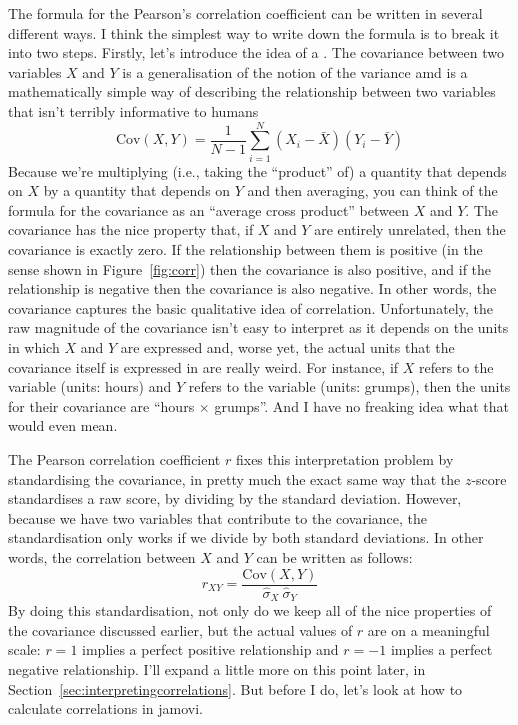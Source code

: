 
The formula for the Pearson's correlation coefficient can be written in several different ways. I think the simplest way to write down the formula is to break it into two steps. Firstly, let's introduce the idea of a . The covariance between two variables $X$ and $Y$ is a generalisation of the notion of the variance amd is a mathematically simple way of describing the relationship between two variables that isn't terribly informative to humans
$$
\mbox{Cov}(X,Y) = \frac{1}{N-1} \sum_{i=1}^N \left( X_i - \bar{X} \right) \left( Y_i - \bar{Y} \right)
$$
Because we're multiplying (i.e., taking the ``product'' of) a quantity that depends on $X$ by a quantity that depends on $Y$ and then averaging, you can think of the formula for the covariance as an ``average cross product'' between $X$ and $Y$. The covariance has the nice property that, if $X$ and $Y$ are entirely unrelated, then the covariance is exactly zero. If the relationship between them is positive (in the sense shown in Figure~\ref{fig:corr}) then the covariance is also positive, and if the relationship is negative then the covariance is also negative. In other words, the covariance captures the basic qualitative idea of correlation. Unfortunately, the raw magnitude of the covariance isn't easy to interpret as it depends on the units in which $X$ and $Y$ are expressed and, worse yet, the actual units that the covariance itself is expressed in are really weird. For instance, if $X$ refers to the  variable (units: hours) and $Y$ refers to the  variable (units: grumps), then the units for their covariance are ``hours $\times$ grumps''. And I have no freaking idea what that would even mean. 

The Pearson correlation coefficient $r$ fixes this interpretation problem by standardising the covariance, in pretty much the exact same way that the $z$-score standardises a raw score, by dividing by the standard deviation. However, because we have two variables that contribute to the covariance, the standardisation only works if we divide by both standard deviations.  In other words, the correlation between $X$ and $Y$ can be written as follows:
$$
r_{XY}  = \frac{\mbox{Cov}(X,Y)}{ \hat{\sigma}_X \ \hat{\sigma}_Y}
$$
By doing this standardisation, not only do we keep all of the nice properties of the covariance discussed earlier, but the actual values of $r$ are on a meaningful scale: $r= 1$ implies a perfect positive relationship and $r = -1$ implies a perfect negative relationship. I'll expand a little more on this point later, in Section~\ref{sec:interpretingcorrelations}. But before I do, let's look at how to calculate correlations in jamovi.

